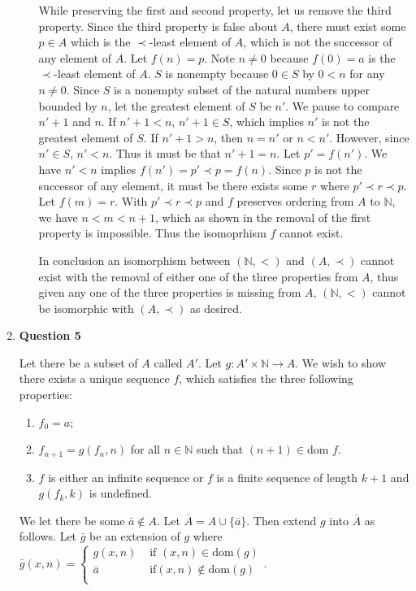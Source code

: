 \documentclass{article}
\begin{document}
\begin{enumerate}
\begin{enumerate}
		\medskip
		While preserving the first and second property, let us remove the third property. Since the third property is false about $A$, there must exist some $p \in A$ which is the $\prec$-least element of $A$, which is not the successor of any element of $A$. Let $f(n) = p$. Note $n \neq 0$ because $f(0) = a$ is the $\prec$-least element of $A$. $S$ is nonempty because $0 \in S$ by $0 < n$ for any $n \neq 0$. Since $S$ is a nonempty subset of the natural numbers upper bounded by $n$, let the greatest element of $S$ be $n'$. We pause to compare $n' + 1$ and $n$. If $n' + 1 < n$, $n' + 1 \in S$, which implies $n'$ is not the greatest element of $S$. If $n' + 1 > n$, then $n = n'$ or $n < n'$. However, since $n' \in S$, $n' < n$. Thus it must be that $n' + 1 = n$. Let $p' = f(n')$. We have $n' < n$ implies $f(n') = p' \prec p = f(n)$. Since $p$ is not the successor of any element, it must be there exists some $r$ where $p'  \prec r \prec p$. Let $f(m) = r$. With $p' \prec r \prec p$ and $f$ preserves ordering from $A$ to $\mathbb{N}$, we have $n < m < n + 1$, which as shown in the removal of the first property is impossible. Thus the isomoprhism $f$ cannot exist.
		
		\medskip
		In conclusion an isomorphism between $(\mathbb{N}, <)$ and $(A, \prec)$ cannot exist with the removal of either one of the three properties from $A$, thus given any one of the three properties is missing from $A$, $(\mathbb{N}, <)$ cannot be isomorphic with $(A, \prec)$ as desired.
		
	\end{enumerate}
		
		\item \textbf{Question 5}
		\medskip
		
		Let there be a subset of $A$ called $A'$. Let $g: A' \times \mathbb{N} \xrightarrow{} A$. We wish to show there exists a unique sequence $f$, which satisfies the three following properties:
		
		\begin{enumerate}
			\item $f_0 = a$;
			\item $f_{n + 1} = g(f_n, n)$ for all $n \in \mathbb{N}$ such that $(n + 1) \in \text{dom } f$.
			\item $f$ is either an infinite sequence or $f$ is a finite sequence of length $k + 1$ and $g(f_k, k)$ is undefined.
		\end{enumerate}
		
		We let there be some $\bar{a} \notin A$. Let $\overline{A} = A \cup \{\bar{a}\}$. Then extend $g$ into $\overline{A}$ as follows. Let $\bar{g}$ be an extension of $g$ where $\bar{g}(x,n) = \begin{cases}
		g(x,n) &\text{ if }(x, n) \in \text{dom} (g)\\
		\bar{a} &\text{ if} (x, n) \notin \text{dom} (g)\\
		\end{cases}$.
		

\end{enumerate}
\end{document}

